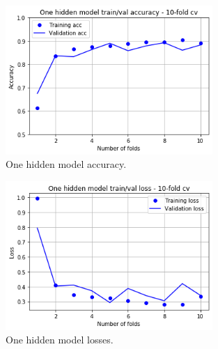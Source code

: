 \begin{figure}
\centering
\includegraphics[width=0.7\textwidth]{./TeX_files/img/onehiddenmodelacc.png}
\caption{One hidden model accuracy.}
\label{fig:onehiddenmodelacc}
\end{figure}

\begin{figure}
\centering
\includegraphics[width=0.7\textwidth]{./TeX_files/img/onehiddenmodelloss.png}
\caption{One hidden model losses.}
\label{fig:onehiddenmodelloss}
\end{figure}

